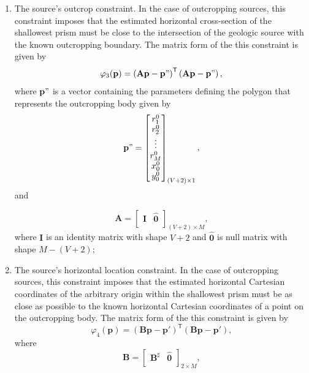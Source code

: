 \documentclass[extra,mreferee]{gji}
\begin{document}
\begin{enumerate}
\item The source’s outcrop constraint. In the case of outcropping sources, this constraint imposes that the estimated horizontal cross-section of the shallowest prism must be close to the intersection of the geologic source with the known outcropping boundary. The matrix form of the this constraint is given by
\begin{equation}
\varphi_{3}(\mathbf{p}) = \left(\mathbf{A}\mathbf{p} - \mathbf{p}"\right)^\mathsf{T}\left(\mathbf{A}\mathbf{p} - \mathbf{p}"\right) ,
\end{equation}
where $\mathbf{p}"$ is a vector containing the parameters defining the polygon that represents the outcropping body given by
\begin{equation}
\mathbf{p}" = 
\begin{bmatrix}
r_{1}^{0} \\
r_{2}^{0} \\
\vdots \\
r_{M}^{0} \\
x_{0}^{0} \\
y_{0}^{0}
\end{bmatrix}_{(V+2)\times 1},
\end{equation}
and

\begin{equation}
\mathbf{A} = 
\begin{bmatrix}
\mathbf{I} & \hat{\mathbf{0}} \\
\end{bmatrix}_{(V+2)\times M},
\end{equation}
where $\mathbf{I}$ is an identity matrix with shape $V+2$ and $\hat{\mathbf{0}}$ is null matrix with shape $M -(V+2)$;

\item The source's horizontal location constraint. In the case of outcropping sources, this constraint imposes that the estimated horizontal Cartesian coordinates of the arbitrary origin within the shallowest prism must be as close as possible to the known horizontal Cartesian coordinates of a point on the outcropping body. The matrix form of the this constraint is given by
\begin{equation}
\varphi_{4}(\mathbf{p}) = \left(\mathbf{B}\mathbf{p} - \mathbf{p}'\right)^\mathsf{T}\left(\mathbf{B}\mathbf{p} - \mathbf{p}'\right) ,
\end{equation}
where
\begin{equation}
\mathbf{B} = 
\begin{bmatrix}
\mathbf{B}^{\sharp} & \hat{\mathbf{0}} \\
\end{bmatrix}_{2\times M} ,
\end{equation}


\end{enumerate}
\end{document}
